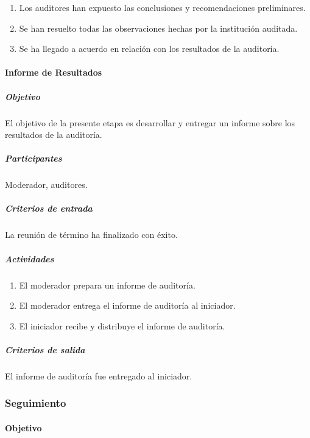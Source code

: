 \begin{enumerate}
	\item
		Los auditores han expuesto las conclusiones y recomendaciones preliminares.
	\item
		Se han resuelto todas las observaciones hechas por la institución auditada.
	\item
		Se ha llegado a acuerdo en relación con los resultados de la auditoría.
\end{enumerate}

\paragraph{Informe de Resultados}

\subparagraph{Objetivo\\}

El objetivo de la presente etapa es desarrollar y entregar un informe sobre los resultados de la auditoría.

\subparagraph{Participantes\\}

Moderador, auditores.

\subparagraph{Criterios de entrada\\}

La reunión de término ha finalizado con éxito. 

\subparagraph{Actividades}

\begin{enumerate}
	\item
		El moderador prepara un informe de auditoría.
	\item
		El moderador entrega el informe de auditoría al iniciador.
	\item
		El iniciador recibe y distribuye el informe de auditoría.
\end{enumerate}

\subparagraph{Criterios de salida\\}

El informe de auditoría fue entregado al iniciador.

\subsubsection{Seguimiento}

\paragraph{Objetivo\\}

